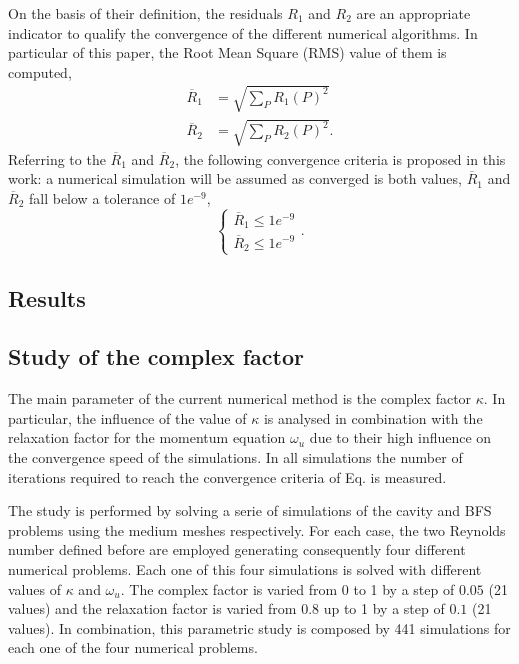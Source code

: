 \documentclass[final,3p,times,11pt,onecolumn]{myElsarticle}
\numberwithin{equation}{section}
\begin{document}
On the basis of their definition, the residuals $R_1$ and $R_2$ are an appropriate indicator to qualify the convergence of the different numerical algorithms. In particular of this paper, the Root Mean Square (RMS) value of them is computed, 
\begin{align}
\overline{R}_1
&=
\sqrt
{
\sum_P
R_1(P)^2
}
\\
\overline{R}_2
&=
\sqrt
{
\sum_P
R_2(P)^2
}.
\end{align}
Referring to the $\overline{R}_1$ and $\overline{R}_2$, the following convergence criteria is proposed in this work: a numerical simulation will be assumed as converged is both values, $\overline{R}_1$ and $\overline{R}_2$  fall below a tolerance of $1e^{-9}$,
\begin{equation}
\left\lbrace
\begin{array}{c}
\overline{R}_1 \leq 1e^{-9} \\
\overline{R}_2 \leq 1e^{-9}
\end{array}
\right..
\end{equation}


  

\subsection{Results}

\subsection{Study of the complex factor}
The main parameter of the current numerical method is the complex factor $\kappa$. In particular, the influence of the value of $\kappa$ is analysed in combination with the relaxation factor for the momentum equation $\omega_{u}$ due to their high influence on the convergence speed of the simulations.  In all simulations the number of iterations required to reach the convergence criteria of Eq. is measured.

The study is performed by solving a serie of simulations of the cavity and BFS problems using the medium meshes respectively. For each case, the two Reynolds number defined before are employed generating consequently four different numerical problems.
Each one of this four simulations is solved with different values of $\kappa$ and $\omega_{u}$. The complex factor is varied from 0 to 1 by a step of $0.05$ (21 values) and the relaxation factor is varied from 0.8 up to 1 by a step of $0.1$ (21 values). In combination, this parametric study is composed by 441 simulations for each one of the four numerical problems.
\end{document}
